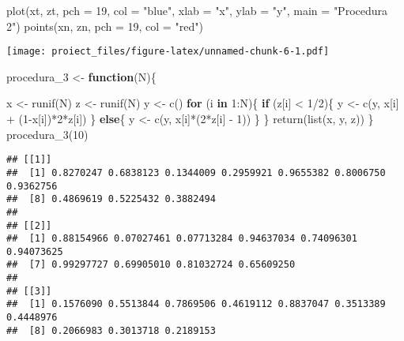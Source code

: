 \documentclass[
]{article}
\newenvironment{Shaded}{\begin{snugshade}}{\end{snugshade}}
\newcommand{\AttributeTok}[1]{\textcolor[rgb]{0.77,0.63,0.00}{#1}}
\newcommand{\ControlFlowTok}[1]{\textcolor[rgb]{0.13,0.29,0.53}{\textbf{#1}}}
\newcommand{\DecValTok}[1]{\textcolor[rgb]{0.00,0.00,0.81}{#1}}
\newcommand{\FunctionTok}[1]{\textcolor[rgb]{0.00,0.00,0.00}{#1}}
\newcommand{\NormalTok}[1]{#1}
\newcommand{\OtherTok}[1]{\textcolor[rgb]{0.56,0.35,0.01}{#1}}
\newcommand{\SpecialCharTok}[1]{\textcolor[rgb]{0.00,0.00,0.00}{#1}}
\newcommand{\StringTok}[1]{\textcolor[rgb]{0.31,0.60,0.02}{#1}}
\begin{document}
\begin{Shaded}
\begin{Highlighting}[]
\FunctionTok{plot}\NormalTok{(xt, zt, }\AttributeTok{pch =} \DecValTok{19}\NormalTok{, }\AttributeTok{col =} \StringTok{"blue"}\NormalTok{, }\AttributeTok{xlab =} \StringTok{"x"}\NormalTok{, }\AttributeTok{ylab =} \StringTok{"y"}\NormalTok{, }\AttributeTok{main =} \StringTok{"Procedura 2"}\NormalTok{)}
\FunctionTok{points}\NormalTok{(xn, zn, }\AttributeTok{pch =} \DecValTok{19}\NormalTok{, }\AttributeTok{col =} \StringTok{"red"}\NormalTok{)}
\end{Highlighting}
\end{Shaded}

\texttt{[image: proiect\_files/figure-latex/unnamed-chunk-6-1.pdf]}

\begin{Shaded}
\begin{Highlighting}[]
\NormalTok{procedura\_3 }\OtherTok{\textless{}{-}} \ControlFlowTok{function}\NormalTok{(N)\{}
  
\NormalTok{x }\OtherTok{\textless{}{-}} \FunctionTok{runif}\NormalTok{(N)}
\NormalTok{z }\OtherTok{\textless{}{-}} \FunctionTok{runif}\NormalTok{(N)}
\NormalTok{y }\OtherTok{\textless{}{-}} \FunctionTok{c}\NormalTok{()}
\ControlFlowTok{for}\NormalTok{ (i }\ControlFlowTok{in} \DecValTok{1}\SpecialCharTok{:}\NormalTok{N)\{}
  \ControlFlowTok{if}\NormalTok{ (z[i] }\SpecialCharTok{\textless{}} \DecValTok{1}\SpecialCharTok{/}\DecValTok{2}\NormalTok{)\{}
\NormalTok{    y }\OtherTok{\textless{}{-}} \FunctionTok{c}\NormalTok{(y, x[i] }\SpecialCharTok{+}\NormalTok{ (}\DecValTok{1}\SpecialCharTok{{-}}\NormalTok{x[i])}\SpecialCharTok{*}\DecValTok{2}\SpecialCharTok{*}\NormalTok{z[i])}
\NormalTok{  \}}
  \ControlFlowTok{else}\NormalTok{\{}
\NormalTok{    y }\OtherTok{\textless{}{-}} \FunctionTok{c}\NormalTok{(y, x[i]}\SpecialCharTok{*}\NormalTok{(}\DecValTok{2}\SpecialCharTok{*}\NormalTok{z[i] }\SpecialCharTok{{-}} \DecValTok{1}\NormalTok{))}
\NormalTok{  \}}
\NormalTok{\}}
\FunctionTok{return}\NormalTok{(}\FunctionTok{list}\NormalTok{(x, y, z))}
\NormalTok{\}}
\FunctionTok{procedura\_3}\NormalTok{(}\DecValTok{10}\NormalTok{)}
\end{Highlighting}
\end{Shaded}

\begin{verbatim}
## [[1]]
##  [1] 0.8270247 0.6838123 0.1344009 0.2959921 0.9655382 0.8006750 0.9362756
##  [8] 0.4869619 0.5225432 0.3882494
## 
## [[2]]
##  [1] 0.88154966 0.07027461 0.07713284 0.94637034 0.74096301 0.94073625
##  [7] 0.99297727 0.69905010 0.81032724 0.65609250
## 
## [[3]]
##  [1] 0.1576090 0.5513844 0.7869506 0.4619112 0.8837047 0.3513389 0.4448976
##  [8] 0.2066983 0.3013718 0.2189153
\end{verbatim}
\end{document}
